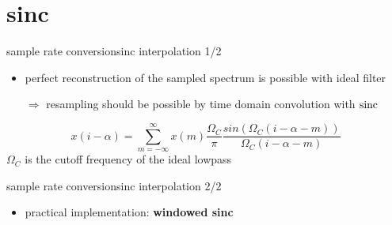         \section{sinc}
	\begin{frame}{sample rate conversion}{sinc interpolation 1/2}
        \begin{itemize}
            \item   perfect reconstruction of the sampled spectrum is possible with ideal filter
            \item   [$\Rightarrow$] resampling should be possible by time domain convolution with $\operatorname*{sinc}$
        \end{itemize}
            \pause
            \begin{equation*}
                x(i-\alpha) = \sum\limits_{m=-\infty}^{\infty}x(m)\frac{\Omega_C}{\pi}\frac{sin\left(\Omega_C(i-\alpha-m)\right)}{\Omega_C(i-\alpha-m)}
            \end{equation*}
            $\Omega_C$ is the cutoff frequency of the  ideal lowpass
    \end{frame}
	\begin{frame}{sample rate conversion}{sinc interpolation 2/2}
        \begin{itemize}
            \item   practical implementation: \textbf{windowed sinc}
        \end{itemize}
    \end{frame}

